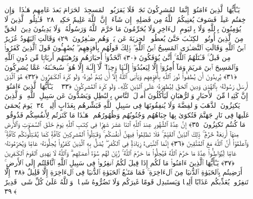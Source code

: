  يَـٰٓأَيُّهَا ٱلَّذِينَ ءَامَنُوٓا۟ إِنَّمَا ٱلمُشرِكُونَ نَجَسٌۭ فَلَا يَقرَبُوا۟ ٱلمَسجِدَ ٱلحَرَامَ بَعدَ عَامِهِم هَـٰذَا ۚ وَإِن خِفتُم عَيلَةًۭ فَسَوفَ يُغنِيكُمُ ٱللَّهُ مِن فَضلِهِۦٓ إِن شَآءَ ۚ إِنَّ ٱللَّهَ عَلِيمٌ حَكِيمٌۭ ﴿٢٨﴾
 قَـٰتِلُوا۟ ٱلَّذِينَ لَا يُؤمِنُونَ بِٱللَّهِ وَلَا بِٱليَومِ ٱلءَاخِرِ وَلَا يُحَرِّمُونَ مَا حَرَّمَ ٱللَّهُ وَرَسُولُهُۥ وَلَا يَدِينُونَ دِينَ ٱلحَقِّ مِنَ ٱلَّذِينَ أُوتُوا۟ ٱلكِتَـٰبَ حَتَّىٰ يُعطُوا۟ ٱلجِزيَةَ عَن يَدٍۢ وَهُم صَـٰغِرُونَ ﴿٢٩﴾
 وَقَالَتِ ٱليَهُودُ عُزَيرٌ ٱبنُ ٱللَّهِ وَقَالَتِ ٱلنَّصَـٰرَى ٱلمَسِيحُ ٱبنُ ٱللَّهِ ۖ ذَٟلِكَ قَولُهُم بِأَفوَٟهِهِم ۖ يُضَٰهِـُٔونَ قَولَ ٱلَّذِينَ كَفَرُوا۟ مِن قَبلُ ۚ قَـٰتَلَهُمُ ٱللَّهُ ۚ أَنَّىٰ يُؤفَكُونَ ﴿٣٠﴾
 ٱتَّخَذُوٓا۟ أَحبَارَهُم وَرُهبَٰنَهُم أَربَابًۭا مِّن دُونِ ٱللَّهِ وَٱلمَسِيحَ ٱبنَ مَريَمَ وَمَآ أُمِرُوٓا۟ إِلَّا لِيَعبُدُوٓا۟ إِلَـٰهًۭا وَٟحِدًۭا ۖ لَّآ إِلَـٰهَ إِلَّا هُوَ ۚ سُبحَـٰنَهُۥ عَمَّا يُشرِكُونَ ﴿٣١﴾
 يُرِيدُونَ أَن يُطفِـُٔوا۟ نُورَ ٱللَّهِ بِأَفوَٟهِهِم وَيَأبَى ٱللَّهُ إِلَّآ أَن يُتِمَّ نُورَهُۥ وَلَو كَرِهَ ٱلكَـٰفِرُونَ ﴿٣٢﴾
 هُوَ ٱلَّذِىٓ أَرسَلَ رَسُولَهُۥ بِٱلهُدَىٰ وَدِينِ ٱلحَقِّ لِيُظهِرَهُۥ عَلَى ٱلدِّينِ كُلِّهِۦ وَلَو كَرِهَ ٱلمُشرِكُونَ ﴿٣٣﴾
 ۞ يَـٰٓأَيُّهَا ٱلَّذِينَ ءَامَنُوٓا۟ إِنَّ كَثِيرًۭا مِّنَ ٱلأَحبَارِ وَٱلرُّهبَانِ لَيَأكُلُونَ أَموَٟلَ ٱلنَّاسِ بِٱلبَٰطِلِ وَيَصُدُّونَ عَن سَبِيلِ ٱللَّهِ ۗ وَٱلَّذِينَ يَكنِزُونَ ٱلذَّهَبَ وَٱلفِضَّةَ وَلَا يُنفِقُونَهَا فِى سَبِيلِ ٱللَّهِ فَبَشِّرهُم بِعَذَابٍ أَلِيمٍۢ ﴿٣٤﴾
 يَومَ يُحمَىٰ عَلَيهَا فِى نَارِ جَهَنَّمَ فَتُكوَىٰ بِهَا جِبَاهُهُم وَجُنُوبُهُم وَظُهُورُهُم ۖ هَـٰذَا مَا كَنَزتُم لِأَنفُسِكُم فَذُوقُوا۟ مَا كُنتُم تَكنِزُونَ ﴿٣٥﴾
 إِنَّ عِدَّةَ ٱلشُّهُورِ عِندَ ٱللَّهِ ٱثنَا عَشَرَ شَهرًۭا فِى كِتَـٰبِ ٱللَّهِ يَومَ خَلَقَ ٱلسَّمَـٰوَٟتِ وَٱلأَرضَ مِنهَآ أَربَعَةٌ حُرُمٌۭ ۚ ذَٟلِكَ ٱلدِّينُ ٱلقَيِّمُ ۚ فَلَا تَظلِمُوا۟ فِيهِنَّ أَنفُسَكُم ۚ وَقَـٰتِلُوا۟ ٱلمُشرِكِينَ كَآفَّةًۭ كَمَا يُقَـٰتِلُونَكُم كَآفَّةًۭ ۚ وَٱعلَمُوٓا۟ أَنَّ ٱللَّهَ مَعَ ٱلمُتَّقِينَ ﴿٣٦﴾
 إِنَّمَا ٱلنَّسِىٓءُ زِيَادَةٌۭ فِى ٱلكُفرِ ۖ يُضَلُّ بِهِ ٱلَّذِينَ كَفَرُوا۟ يُحِلُّونَهُۥ عَامًۭا وَيُحَرِّمُونَهُۥ عَامًۭا لِّيُوَاطِـُٔوا۟ عِدَّةَ مَا حَرَّمَ ٱللَّهُ فَيُحِلُّوا۟ مَا حَرَّمَ ٱللَّهُ ۚ زُيِّنَ لَهُم سُوٓءُ أَعمَـٰلِهِم ۗ وَٱللَّهُ لَا يَهدِى ٱلقَومَ ٱلكَـٰفِرِينَ ﴿٣٧﴾
 يَـٰٓأَيُّهَا ٱلَّذِينَ ءَامَنُوا۟ مَا لَكُم إِذَا قِيلَ لَكُمُ ٱنفِرُوا۟ فِى سَبِيلِ ٱللَّهِ ٱثَّاقَلتُم إِلَى ٱلأَرضِ ۚ أَرَضِيتُم بِٱلحَيَوٰةِ ٱلدُّنيَا مِنَ ٱلءَاخِرَةِ ۚ فَمَا مَتَـٰعُ ٱلحَيَوٰةِ ٱلدُّنيَا فِى ٱلءَاخِرَةِ إِلَّا قَلِيلٌ ﴿٣٨﴾
 إِلَّا تَنفِرُوا۟ يُعَذِّبكُم عَذَابًا أَلِيمًۭا وَيَستَبدِل قَومًا غَيرَكُم وَلَا تَضُرُّوهُ شَيـًۭٔا ۗ وَٱللَّهُ عَلَىٰ كُلِّ شَىءٍۢ قَدِيرٌ ﴿٣٩﴾
